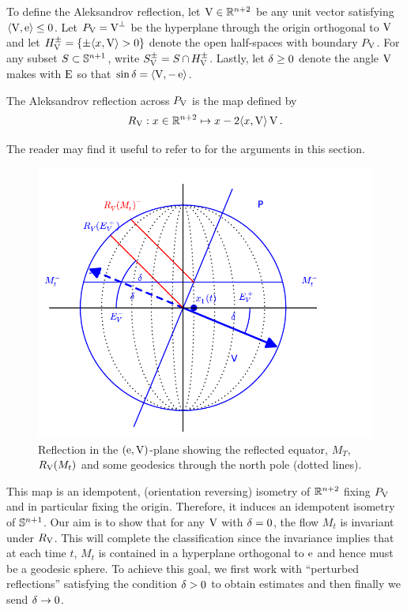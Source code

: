 \documentclass{amsart}
\begin{document}
To define the Aleksandrov reflection, let \(\reflectionvector \in \R^{n+2}\) be any unit vector satisfying \(\ip{\reflectionvector}{\vertvec} \leq 0\). Let \(\reflectionplane = \reflectionvector^{\perp}\) be the hyperplane through the origin orthogonal to \(\reflectionvector\) and let \(\reflectionhalfspace^{\pm} = \{\pm \ip{x}{\reflectionvector} > 0\}\) denote the open half-spaces with boundary \(\reflectionplane\). For any subset \(S \subset \S^{n+1}\), write \(\reflectionset{S}^{\pm} = S \intersect \reflectionhalfspace^{\pm}\). Lastly, let \(\reflectionangle \geq 0\) denote the angle \(\reflectionvector\) makes with \(\equator\) so that \(\sin \reflectionangle = \ip{\reflectionvector}{-\vertvec}\).
\begin{definition}
The Aleksandrov reflection across \(\reflectionplane\) is the map defined by
\[
\reflectionmap: x \in \R^{n+2} \mapsto x - 2\ip{x}{\reflectionvector} \reflectionvector.
\]
\end{definition}
The reader may find it useful to refer to  for the arguments in this section.
\begin{figure}[htb]
\centering
\includegraphics[width=.9\linewidth]{./reflection.pdf}
\caption{Reflection in the $(\vertvec, \reflectionvector)$-plane showing the reflected equator, \(M_T\), \(\reflectionmap(M_t)\) and some geodesics through the north pole (dotted lines).}
\label{fig:reflection}
\end{figure}
This map is an idempotent, (orientation reversing) isometry of \(\R^{n+2}\) fixing \(\reflectionplane\) and in particular fixing the origin. Therefore, it induces an idempotent isometry of \(\S^{n+1}\). Our aim is to show that for any \(\reflectionvector\) with \(\reflectionangle = 0\), the flow \(M_t\) is invariant under \(\reflectionmap\). This will complete the classification since the invariance implies that at each time \(t\), \(M_t\) is contained in a hyperplane orthogonal to \(\vertvec\) and hence must be a geodesic sphere. To achieve this goal, we first work with ``perturbed reflections'' satisfying the condition \(\reflectionangle > 0\) to obtain estimates and then finally we send \(\reflectionangle \to 0\). 
\end{document}
